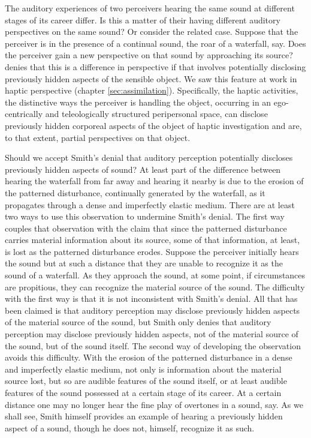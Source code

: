 The auditory experiences of two perceivers hearing the same sound at different stages of its career differ. Is this a matter of their having different auditory perspectives on the same sound? Or consider the related case. Suppose that the perceiver is in the presence of a continual sound, the roar of a waterfall, say. Does the perceiver gain a new perspective on that sound by approaching its source? \citet[135]{Smith:2002sa} denies that this is a difference in perspective if that involves potentially disclosing previously hidden aspects of the sensible object. We saw this feature at work in haptic perspective (chapter \ref{sec:assimilation}). Specifically, the haptic activities, the distinctive ways the perceiver is handling the object, occurring in an ego-centrically and teleologically structured peripersonal space, can disclose previously hidden corporeal aspects of the object of haptic investigation and are, to that extent, partial perspectives on that object. 

Should we accept Smith's denial that auditory perception potentially discloses previously hidden aspects of sound? At least part of the difference between hearing the waterfall from far away and hearing it nearby is due to the erosion of the patterned disturbance, continually generated by the waterfall, as it propagates through a dense and imperfectly elastic medium. There are at least two ways to use this observation to undermine Smith's denial. The first way couples that observation with the claim that since the patterned disturbance carries material information about its source, some of that information, at least, is lost as the patterned disturbance erodes. Suppose the perceiver initially hears the sound but at such a distance that they are unable to recognize it as the sound of a waterfall. As they approach the sound, at some point, if circumstances are propitious, they can recognize the material source of the sound. The difficulty with the first way is that it is not inconsistent with Smith's denial. All that has been claimed is that auditory perception may disclose previously hidden aspects of the material source of the sound, but Smith only denies that auditory perception may disclose previously hidden aspects, not of the material source of the sound, but of the sound itself. The second way of developing the observation avoids this difficulty. With the erosion of the patterned disturbance in a dense and imperfectly elastic medium, not only is information about the material source lost, but so are audible features of the sound itself, or at least audible features of the sound possessed at a certain stage of its career. At a certain distance one may no longer hear the fine play of overtones in a sound, say. As we shall see, Smith himself provides an example of hearing a previously hidden aspect of a sound, though he does not, himself, recognize it as such.

